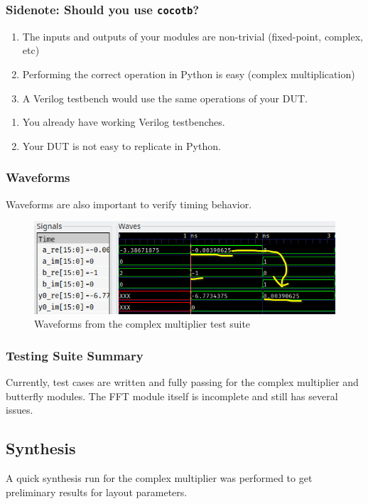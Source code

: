 \documentclass{beamer}
\begin{document}
\begin{frame}
	\frametitle{Sidenote: Should you use \texttt{cocotb}?}
	\begin{enumerate}
		\item The inputs and outputs of your modules are 
			non-trivial (fixed-point, complex, etc)
		\item Performing the correct operation in 
			Python is easy (complex multiplication)
		\item A Verilog testbench would use the 
			same operations of your DUT.
	\end{enumerate}

	\begin{enumerate}
		\item You already have working Verilog testbenches.
		\item Your DUT is not easy to replicate in Python.
	\end{enumerate}
\end{frame}

\begin{frame}
	\frametitle{Waveforms}
	Waveforms are also important to verify timing behavior.
	\begin{figure}
		\includegraphics[width=\linewidth]{./../first_report/figures/cplx_mul_waveform.png}
		\caption{Waveforms from the complex multiplier test suite}
		\centering
	\end{figure}
\end{frame}

\begin{frame}
	\frametitle{Testing Suite Summary}
	Currently, test cases are written and fully passing for the complex multiplier
	and butterfly modules. The FFT module itself is incomplete and still has several issues.
\end{frame}

\subsection{Synthesis}
\begin{frame}
A quick synthesis run for the complex multiplier was performed to get preliminary results
for layout parameters.
\end{frame}
\end{document}
